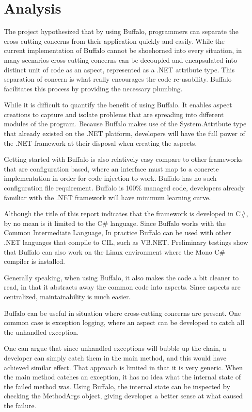 \chapter{Analysis}

The project hypothesized that by using Buffalo, programmers can separate the cross-cutting concerns from their application quickly and easily. While the current implementation of Buffalo cannot be shoehorned into every situation, in many scenarios cross-cutting concerns can be decoupled and encapsulated into distinct unit of code as an aspect, represented as a .NET attribute type. This separation of concern is what really encourages the code re-usability. Buffalo facilitates this process by providing the necessary plumbing. 

While it is difficult to quantify the benefit of using Buffalo. It enables aspect creations to capture and isolate problems that are spreading into different modules of the program. Because Buffalo makes use of the System.Attribute type that already existed on the .NET platform, developers will have the full power of the .NET framework at their disposal when creating the aspects. 

Getting started with Buffalo is also relatively easy compare to other frameworks that are configuration based, where an interface must map to a concrete implementation in order for code injection to work. Buffalo has no such configuration file requirement. Buffalo is 100\% managed code, developers already familiar with the .NET framework will have minimum learning curve.

Although the title of this report indicates that the framework is developed in C\#, by no mean is it limited to the C\# language. Since Buffalo works with the Common Intermediate Language, In practice Buffalo can be used with other .NET languages that compile to CIL, such as VB.NET. Preliminary testings show that Buffalo can also work on the Linux environment where the Mono C\# compiler is installed.

Generally speaking, when using Buffalo, it also makes the code a bit cleaner to read, in that it abstracts away the common code into aspects. Since aspects are centralized, maintainability is much easier. 

Buffalo can be useful in situation where cross-cutting concerns are present. One common case is exception logging, where an aspect can be developed to catch all the unhandled exception.

One can argue that since unhandled exceptions will bubble up the chain, a developer can simply catch them in the main method, and this would have achieved similar effect. That approach is limited in that it is very generic. When the main method catches an exception, it has no idea what the internal state of the failed method was. Using Buffalo, the internal state can be inspected by checking the MethodArgs object, giving developer a better sense at what caused the failure.

